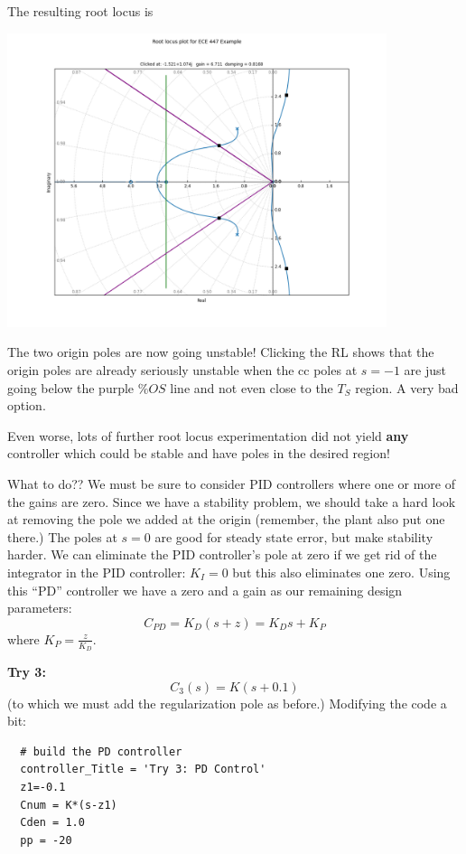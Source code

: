 \begin{ExampleCont}
The resulting root locus is

\begin{center}
\includegraphics[width=111mm]{figs09/R15J19.png}
\end{center}

The two origin poles are now going unstable!  Clicking the RL shows
that the origin poles are already seriously unstable when the
cc poles at $s=-1$ are just going below the purple $\%OS$ line
and not even close to the $T_S$ region.  A very bad option.

Even worse, lots of further root locus experimentation did not yield {\bf any}
controller which could be stable and have poles in the desired region!

What to do??    We must be sure to consider PID controllers where one or
 more of the gains are zero.   Since we have a stability problem, we should
 take a hard look at removing the pole we added at the origin (remember,
 the plant also put one there.)
The poles at $s=0$ are good for steady state error, but make stability harder.
We can eliminate the PID controller's  pole at zero if we get rid of the integrator in the PID controller: $K_I = 0$ but this also eliminates one zero.  Using this ``PD'' controller we have a zero and a gain as our remaining design parameters:
\[
C_{PD} = K_D(s+z) = K_Ds + K_P
\]
where $K_P = \frac {z}  {K_D}$.

{\bf Try 3: }
\[
C_3(s) = K(s+0.1)
\]
(to which we must add the regularization pole as before.)
Modifying the code a bit:

\begin{verbatim}
  # build the PD controller
  controller_Title = 'Try 3: PD Control'
  z1=-0.1
  Cnum = K*(s-z1)
  Cden = 1.0
  pp = -20
\end{verbatim}


\end{ExampleCont}

